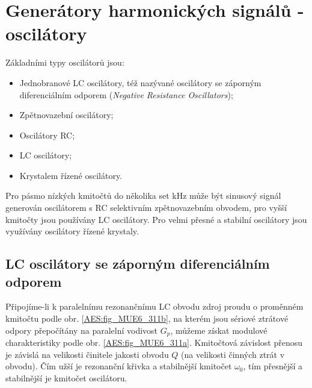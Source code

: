   \section{Generátory harmonických signálů - oscilátory}
    Základními typy oscilátorů jsou:
    \begin{itemize}\addtolength{\itemsep}{-0.5\baselineskip}
      \item Jednobranové LC oscilátory, též nazývané oscilátory se záporným diferenciálním odporem 
            (\emph{Negative Resistance Oscillators});
      \item Zpětnovazební oscilátory;
      \item Oscilátory RC;
      \item LC oscilátory;
      \item Krystalem řízené oscilátory.
    \end{itemize}

    Pro pásmo nízkých kmitočtů do několika set kHz může být sinusový signál generován oscilátorem s 
    RC selektivním zpětnovazebním obvodem, pro vyšší kmitočty jsou používány LC oscilátory. Pro 
    velmi přesné a stabilní oscilátory jsou využívány oscilátory řízené krystaly.
    
    \subsection{LC oscilátory se záporným diferenciálním odporem}
      Připojíme-li k paralelnímu rezonančnímu LC obvodu zdroj proudu o proměnném kmitočtu podle 
      obr. \ref{AES:fig_MUE6_311b}, na kterém jsou sériové ztrátové odpory přepočítány na paralelní 
      vodivost \(G_p\), můžeme získat modulové charakteristiky podle obr. \ref{AES:fig_MUE6_311a}. 
      Kmitočtová závislost přenosu je závislá na velikosti činitele jakosti obvodu \(Q\) (na 
      velikosti činných ztrát v obvodu). Čím užší je rezonanční křivka a stabilnější kmitočet 
      \(\omega_0\), tím přesnější a stabilnější je kmitočet oscilátoru.

